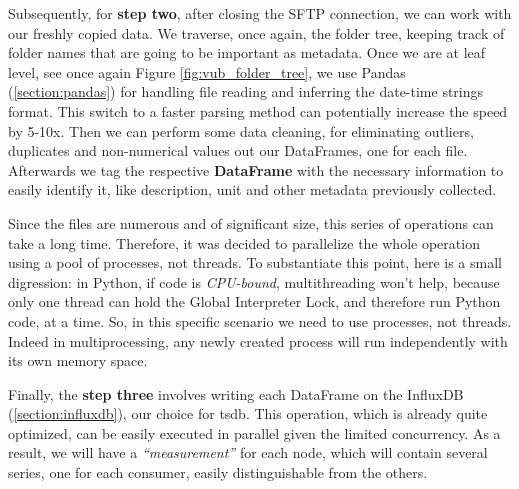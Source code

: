 Subsequently, for \textbf{step two}, after closing the \ac{SFTP} connection, we can work with our freshly copied data. We traverse, once again, the folder tree, keeping track of
folder names that are going to be important as metadata. Once we are at leaf level, see once again Figure \ref{fig:vub_folder_tree}, we use 
Pandas (\ref{section:pandas}) for handling file reading and inferring the date-time strings format. This switch to a faster parsing method can potentially increase the speed by 5-10x. %
Then we can perform some data cleaning, for eliminating outliers, duplicates and non-numerical values out our DataFrames, one for each file.
Afterwards we tag the respective \textbf{DataFrame} with the necessary information to easily identify it, like description, unit and other metadata previously collected.

Since the files are numerous and of significant size, this series of operations can take a long time. 
Therefore, it was decided to parallelize the whole operation using a pool of processes, not threads. To substantiate this point, here is a small digression: 
in Python, if code is \textit{CPU-bound}, multithreading won't help, because only one thread can hold the Global Interpreter Lock, and therefore run Python code, at a time. 
So, in this specific scenario we need to use processes, not threads. Indeed in multiprocessing, any newly created process will run independently with its own memory space.

Finally, the \textbf{step three} involves writing each DataFrame on the InfluxDB (\ref*{section:influxdb}), our choice for \acl{tsdb}.
This operation, which is already quite optimized, can be easily executed in parallel given the limited concurrency.
As a result, we will have a \textit{``measurement''} for each node, which will contain several series, one for each consumer, easily distinguishable from the others.


